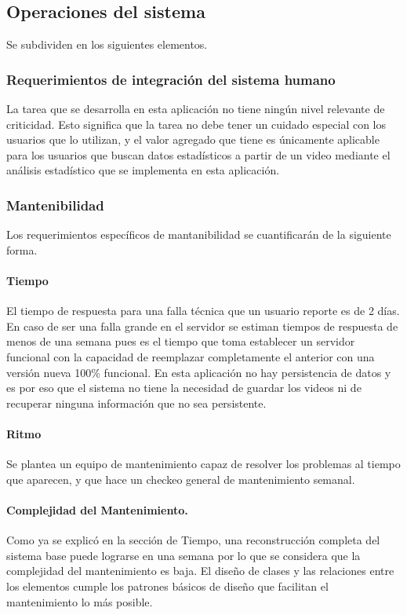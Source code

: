 \documentclass[a4paper]{article}
\newcommand\tab[1][0.55cm]{\hspace*{#1}}
\begin{document}
{\color{Blue}
\subsection{Operaciones del sistema}
\color{black}
\justify 

	\tab Se subdividen en los siguientes elementos. 
   
\subsubsection{Requerimientos de integración del sistema humano}

	\tab La tarea que se desarrolla en esta aplicación no tiene ningún nivel relevante de criticidad. Esto significa que la tarea no debe tener un cuidado especial con los usuarios que lo utilizan, y el valor agregado que tiene es únicamente aplicable para los usuarios que buscan datos estadísticos a partir de un video mediante el análisis estadístico que se implementa en esta aplicación. 

\subsubsection{Mantenibilidad}  %

	\tab Los requerimientos específicos de mantanibilidad se cuantificarán de la siguiente forma. 
    
    \paragraph{Tiempo} El tiempo de  respuesta para una falla técnica que un usuario reporte es de 2 días. En caso de ser una falla grande en el servidor se estiman tiempos de respuesta de menos de una semana pues es el tiempo que toma establecer un servidor funcional con la capacidad de reemplazar completamente el anterior con una versión nueva 100\% funcional. En esta aplicación no hay persistencia de datos y es por eso que el sistema no tiene la necesidad de guardar los videos ni de recuperar ninguna información que no sea persistente.  
    
    \paragraph{Ritmo} Se plantea un equipo de mantenimiento capaz de resolver los problemas al tiempo que aparecen, y que hace un checkeo general de mantenimiento semanal. 
    
    \paragraph{Complejidad del Mantenimiento.} Como ya se explicó en la sección de Tiempo, una reconstrucción completa del sistema base puede lograrse en una semana por lo que se considera que la complejidad del mantenimiento es baja. El diseño de clases y las relaciones entre los elementos cumple los patrones básicos de diseño que facilitan el mantenimiento lo más posible. 
    
}
\end{document}
